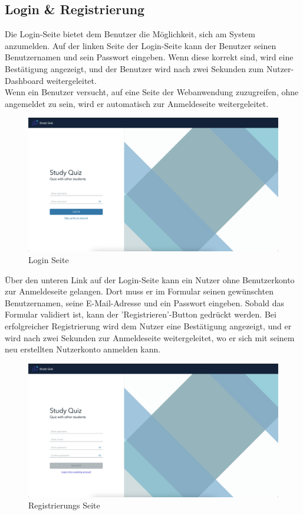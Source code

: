 \subsection*{Login \& Registrierung}

\noindent Die Login-Seite bietet dem Benutzer die Möglichkeit, sich am System anzumelden. 
Auf der linken Seite der Login-Seite kann der Benutzer seinen Benutzernamen und sein Passwort 
eingeben. Wenn diese korrekt sind, wird eine Bestätigung angezeigt, und der Benutzer wird nach 
zwei Sekunden zum Nutzer-Dashboard weitergeleitet. \\

\noindent Wenn ein Benutzer versucht, auf eine Seite der Webanwendung zuzugreifen, 
ohne angemeldet zu sein, wird er automatisch zur Anmeldeseite weitergeleitet.

\begin{figure}[H]
  \includegraphics[width=\linewidth]{img/login.png}
  \caption{Login Seite}
  \label{fig:login}
\end{figure}

\noindent Über den unteren Link auf der Login-Seite kann ein Nutzer ohne Benutzerkonto zur 
Anmeldeseite gelangen. Dort muss er im Formular seinen gewünschten Benutzernamen, 
seine E-Mail-Adresse und ein Passwort eingeben. Sobald das Formular validiert ist, 
kann der 'Registrieren'-Button gedrückt werden. Bei erfolgreicher Registrierung wird 
dem Nutzer eine Bestätigung angezeigt, und er wird nach zwei Sekunden zur Anmeldeseite 
weitergeleitet, wo er sich mit seinem neu erstellten Nutzerkonto anmelden kann.

\begin{figure}[H]
  \includegraphics[width=\linewidth]{img/register.png}
  \caption{Registrierungs Seite}
  \label{fig:register}
\end{figure}

